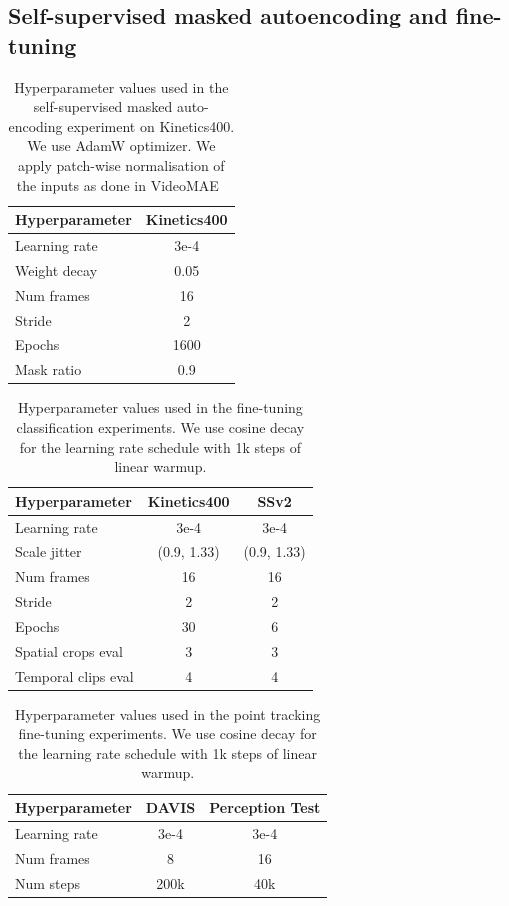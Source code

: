 \subsection{Self-supervised masked autoencoding and fine-tuning}

\begin{table}[h!]
    \centering
    \begin{tabular}{l|c}
     \textbf{Hyperparameter} & \textbf{Kinetics400} \\
     \hline
      Learning rate  & 3e-4  \\
      Weight decay & 0.05 \\
      Num frames & 16  \\
      Stride & 2  \\
      Epochs & 1600  \\
      Mask ratio & 0.9 \\
      \hline
    \end{tabular}
    \caption{Hyperparameter values used in the self-supervised masked auto-encoding experiment on Kinetics400. We use AdamW optimizer. We apply patch-wise normalisation of the inputs as done in VideoMAE~\cite{tong2022videomae}}
    \label{tab:hypersssup}
\end{table}

\begin{table}[h!]
    \centering
    \begin{tabular}{l|c|c}
     \textbf{Hyperparameter} & \textbf{Kinetics400} & \textbf{SSv2} \\
     \hline
      Learning rate  & 3e-4 & 3e-4 \\
      Scale jitter & (0.9, 1.33) & (0.9, 1.33) \\
      Num frames & 16 & 16 \\
      Stride & 2 & 2 \\
      Epochs & 30 & 6 \\
      Spatial crops eval & 3 & 3 \\
      Temporal clips eval & 4 & 4\\
      \hline
    \end{tabular}
    \caption{Hyperparameter values used in the fine-tuning classification experiments. We use cosine decay for the learning rate schedule with 1k steps of linear warmup.}
    \label{tab:hypersFTcls}
\end{table}

\begin{table}[h!]
    \centering
    \begin{tabular}{l|c|c}
     \textbf{Hyperparameter} & \textbf{DAVIS} & \textbf{Perception Test} \\
     \hline
      Learning rate  & 3e-4 & 3e-4 \\
      Num frames & 8 & 16 \\
      Num steps & 200k & 40k \\
      \hline
    \end{tabular}
    \caption{Hyperparameter values used in the point tracking fine-tuning experiments. We use cosine decay for the learning rate schedule with 1k steps of linear warmup.}
    \label{tab:hypersFTpt}
\end{table}

